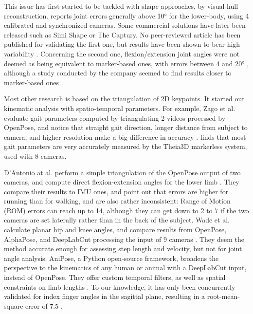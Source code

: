 This issue has first started to be tackled with shape approaches, by visual-hull reconstruction. \cite{Ceseracciu2014} reports joint errors generally above 10° for the lower-body, using 4 calibrated and synchronized cameras. Some commercial solutions have later been released such as Simi Shape or The Captury. No peer-reviewed article has been published for validating the first one, but results have been shown to bear high variability \cite{Becker2015}. Concerning the second one, flexion/extension joint angles were not deemed as being equivalent to marker-based ones, with errors between 4 and 20° \cite{Harsted2019}, although a study conducted by the company seemed to find results closer to marker-based ones \cite{Fleisig2022}. 

Most other research is based on the triangulation of 2D keypoints. It started out kinematic analysis with spatio-temporal parameters. For example, Zago et al. evaluate gait parameters computed by triangulating 2 videos processed by OpenPose, and notice that straight gait direction, longer distance from subject to camera, and higher resolution make a big difference in accuracy \cite{Zago2020}. \cite{Kanko2021a} finds that most gait parameters are very accurately measured by the Theia3D markerless system, used with 8 cameras.

D’Antonio at al. perform a simple triangulation of the OpenPose output of two cameras, and compute direct flexion-extension angles for the lower limb \cite{D'Antonio2021}. They compare their results to IMU ones, and point out that errors are higher for running than for walking, and are also rather inconsistent: Range of Motion (ROM) errors can reach up to 14\degree{}, although they can get down to 2 to 7\degree{} if the two cameras are set laterally rather than in the back of the subject. Wade et al. calculate planar hip and knee angles, and compare results from OpenPose, AlphaPose, and DeepLabCut processing the input of 9 cameras \cite{Wade2021}. They deem the method accurate enough for assessing step length and velocity, but not for joint angle analysis. AniPose, a Python open-source framework, broadens the perspective to the kinematics of any human or animal with a DeepLabCut input, instead of OpenPose. They offer custom temporal filters, as well as spatial constraints on limb lengths \cite{Karashchuk2021}. To our knowledge, it has only been concurrently validated for index finger angles in the sagittal plane, resulting in a root-mean-square error of 7.5\degree{} \cite{Geelen2021}.

